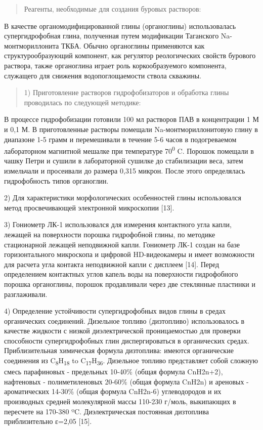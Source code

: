 \begin{quote}
Реагенты, необходимые для создания буровых растворов:
\end{quote}

В качестве органомодифицированной глины (органоглины) использовалась
супергидрофобная глина, полученная путем модификации Таганского
Na-монтмориллонита ТКБА. Обычно органоглины применяются как
структурообразующий компонент, как регулятор реологических свойств
бурового раствора, также органоглина играет роль коркообразуемого
компонента, служащего для снижения водопоглощаемости ствола скважины.

\begin{quote}
1) Приготовление растворов гидрофобизаторов и обработка глины
проводилась по следующей методике:
\end{quote}

В процессе гидрофобизации готовили 100 мл растворов ПАВ в концентрации 1
М и 0,1 М. В приготовленные растворы помещали Na-монтмориллонитовую
глину в диапазоне 1-5 грамм и перемешивали в течение 5-6 часов в
подогреваемом лабораторном магнитной мешалке при температуре
70\textsuperscript{0} C. Порошок помещали в чашку Петри и сушили в
лабораторной сушилке до стабилизации веса, затем измельчали и просеивали
до размера 0,315 микрон. После этого определялась гидрофобность типов
органоглин.

2) Для характеристики морфологических особенностей глины использовался
метод просвечивающей электронной микроскопии {[}13{]}.

3) Гониометр ЛК-1 использовался для измерения контактного угла капли,
лежащей на поверхности порошка гидрофобной глины, по методике
стационарной лежащей неподвижной капли. Гониометр ЛК-1 создан на базе
горизонтального микроскопа и цифровой HD-видеокамеры и имеет возможности
для расчета угла контакта неподвижной капли с дисплеем {[}14{]}. Перед
определением контактных углов капель воды на поверхности гидрофобного
порошка органоглины, порошок продавливали через две стеклянные пластинки
и разглаживали.

4) Определение устойчивости супергидрофобных видов глины в средах
органических соединений. Дизельное топливо (дизтопливо) использовалось в
качестве жидкости с низкой диэлектрической проницаемостью для проверки
способности супергидрофобных глин диспергироваться в органических
средах. Приблизительная химическая формула дизтоплива: имеются
органические соединения из C\textsubscript{8}H\textsubscript{18} to
C\textsubscript{17}H\textsubscript{36}. Дизельное топливо представляет
собой сложную смесь парафиновых - предельных 10-40\% (общая формула
CnH2n+2), нафтеновых - полиметиленовых 20-60\% (общая формула CnH2n) и
ареновых - ароматических 14-30\% (общая формула CnH2n-6) углеводородов и
их производных средней молекулярной массы 110-230 г/моль, выкипающих в
пересчете на 170-380 ºC. Диэлектрическая постоянная дизтоплива
приблизительно ε=2,05 {[}15{]}.

